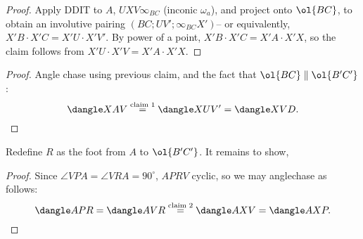 \documentclass{seto}
\begin{document}
\begin{proof}Apply DDIT to $A$, $UXV\infty_{BC}$ (inconic $\omega_a$), and
project onto $\ol{BC}$, to obtain an involutive pairing
$(BC;UV';\infty_{BC}X')$-- or equivalently, $X'B\cdot X'C=X'U\cdot X'V'$.
By power of a point, $X'B\cdot X'C=X'A\cdot X'X$, so the claim follows from $X'U\cdot X'V=X'A\cdot X'X$. \end{proof}
\begin{proof} Angle chase using previous claim, and the fact that $\ol{BC}\parallel\ol{B'C'}$: 
\[\dangle XAV \overset{\text{claim }1}= \dangle XUV'=\dangle XVD.\qedhere\] \end{proof} 
Redefine $R$ as the foot from $A$ to $\ol{B'C'}$. It remains to show,
\begin{proof}Since $\angle VPA=\angle VRA=90^\circ$, $APRV$ cyclic, so we may anglechase as follows: 
\[\dangle APR=\dangle AVR \overset{\text{claim }2} =\dangle AXV=\dangle AXP.\qedhere\] 
\end{proof}
\end{document}
